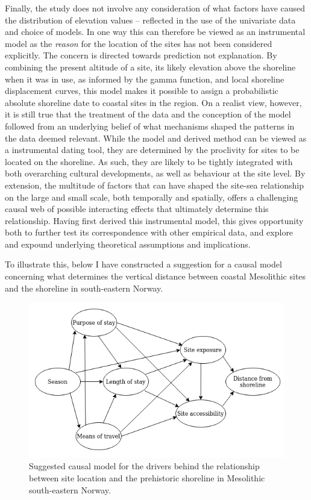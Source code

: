 \documentclass[
  12pt,
  a4paper,
  oneside]{book}
\begin{document}
Finally, the study does not involve any consideration of what factors have caused the distribution of elevation values -- reflected in the use of the univariate data and choice of models. In one way this can therefore be viewed as an instrumental model as the \emph{reason} for the location of the sites has not been considered explicitly. The concern is directed towards prediction not explanation. By combining the present altitude of a site, its likely elevation above the shoreline when it was in use, as informed by the gamma function, and local shoreline displacement curves, this model makes it possible to assign a probabilistic absolute shoreline date to coastal sites in the region. On a realist view, however, it is still true that the treatment of the data and the conception of the model followed from an underlying belief of what mechanisms shaped the patterns in the data deemed relevant. While the model and derived method can be viewed as a instrumental dating tool, they are determined by the proclivity for sites to be located on the shoreline. As such, they are likely to be tightly integrated with both overarching cultural developments, as well as behaviour at the site level. By extension, the multitude of factors that can have shaped the site-sea relationship on the large and small scale, both temporally and spatially, offers a challenging causal web of possible interacting effects that ultimately determine this relationship. Having first derived this instrumental model, this gives opportunity both to further test its correspondence with other empirical data, and explore and expound underlying theoretical assumptions and implications.

To illustrate this, below I have constructed a suggestion for a causal model concerning what determines the vertical distance between coastal Mesolithic sites and the shoreline in south-eastern Norway.

\begin{figure}

{\centering \includegraphics[width=1\linewidth]{figures/dag_paper1} 

}

\caption{Suggested causal model for the drivers behind the relationship between site location and the prehistoric shoreline in Mesolithic south-eastern Norway.}\label{fig:d1}
\end{figure}
\end{document}
